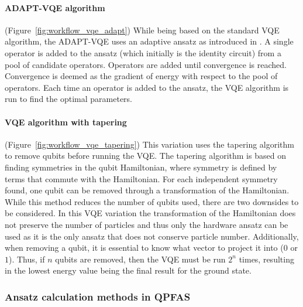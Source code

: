\documentclass[journal,onecolumn]{IEEEtran}
\begin{document}
  \paragraph{ADAPT-VQE algorithm} (Figure~\ref{fig:workflow_vqe_adapt})
    While being based on the standard VQE algorithm, the ADAPT-VQE uses an adaptive ansatz as introduced in \cite{grimsley2019adaptive}. 
    A single operator is added to the ansatz (which initially is the identity circuit) from a pool of candidate operators.
    Operators are added until convergence is reached. 
    Convergence is deemed as the gradient of energy with respect to the pool of operators. 
    Each time an operator is added to the ansatz, the VQE algorithm is run to find the optimal parameters.
    
  \paragraph{VQE algorithm with tapering} (Figure~\ref{fig:workflow_vqe_tapering})
    This variation uses the tapering algorithm \cite{bravyi2017tapering} to remove qubits before running the VQE. 
    The tapering algorithm is based on finding symmetries in the qubit Hamiltonian, where symmetry is defined by terms that commute with the Hamiltonian. 
    For each independent symmetry found, one qubit can be removed through a transformation of the Hamiltonian. 
    While this method reduces the number of qubits used, there are two downsides to be considered. 
    In this VQE variation the transformation of the Hamiltonian does not preserve the number of particles and thus only the hardware ansatz can be used as it is the only ansatz that does not conserve particle number. 
    Additionally, when removing a qubit, it is essential to know what vector to project it into ($0$ or $1$). Thus, if $n$ qubits are removed, then the VQE must be run $2^n$ times, resulting in the lowest energy value being the final result for the ground state.



\subsubsection{Ansatz calculation methods in QPFAS}  
\label{sec:ansatz_calculation_methods_in_qpfas}

\end{document}
